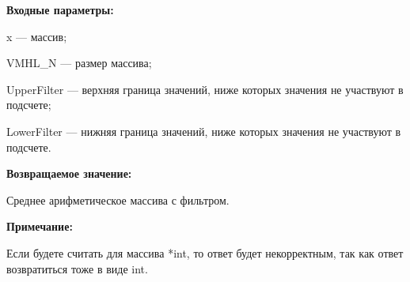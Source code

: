 \textbf{Входные параметры:}

 x --- массив;
 
 VMHL\_N --- размер массива;
 
 UpperFilter --- верхняя граница значений, ниже которых значения не участвуют в подсчете;
 
 LowerFilter --- нижняя граница значений, ниже которых значения не участвуют в подсчете.

\textbf{Возвращаемое значение:}

 Среднее арифметическое массива с фильтром.
 
\textbf{Примечание:}

Если будете считать для массива *int, то ответ будет некорректным, так как ответ возвратиться тоже в виде int.
 
